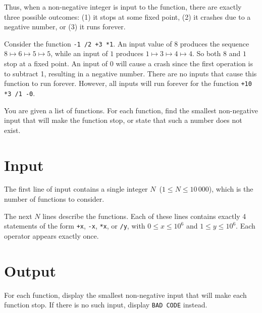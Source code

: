 Thus, when a non-negative integer is input to the function, there are exactly three possible outcomes: (1) it stops at some fixed point, (2) it crashes due to a negative number, or (3) it runs forever.

Consider the function \texttt{-1 /2 +3 *1}. An input value of $8$ produces the sequence
$8 \mapsto 6 \mapsto 5 \mapsto 5$, while an input of $1$ produces $ 1\mapsto 3 \mapsto 4 \mapsto 4$. So both $8$ and $1$ stop at a fixed point.
An input of $0$ will cause a crash since the first operation is to subtract 1, resulting in a negative number. There are no inputs that cause this function to run forever. However, all inputs will run forever for the function \texttt{+10 *3 /1 -0}.

You are given a list of functions. For each function, find the smallest non-negative input that will make the function stop, or state that such a number does not exist.

\section*{Input}

The first line of input contains a single integer $N$~($1 \leq N \leq 10\,000$), which is the number of functions to consider.

The next $N$ lines describe the functions. Each of these lines contains exactly 4 statements of the form \texttt{+x}, \texttt{-x}, \texttt{*x}, or \texttt{/y}, with $0\leq x\leq 10^6$ and $1 \leq y \leq 10^6$.
Each operator appears exactly once.


\section*{Output}

For each function, display the smallest non-negative input that will make each function stop. If there is no such input, display \texttt{BAD CODE} instead.
